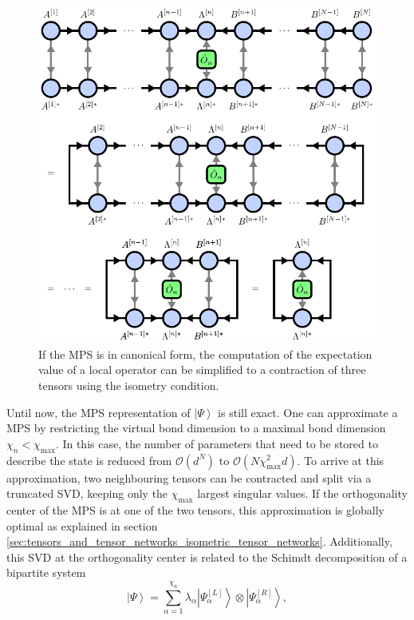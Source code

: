 \begin{figure}
	\centering
	\includegraphics[scale=1.0]{figures/tikz/Tensor_Networks/mps_canonical_form_local_expectation_value/mps_canonical_form_local_expectation_value.pdf}
	\caption{If the MPS is in canonical form, the computation of the expectation value of a local operator can be simplified to a contraction of three tensors using the isometry condition.}
	\label{fig:mps_local_expectation_value_canonical}
\end{figure}
Until now, the MPS representation of $\left|\Psi\right\rangle$ is still exact. One can approximate a MPS by restricting the virtual bond dimension to a maximal bond dimension $\chi_n < \chi_\text{max}$. In this case, the number of parameters that need to be stored to describe the state is reduced from $\mathcal{O}\left(d^N\right)$ to $\mathcal{O}\left(N\chi_\text{max}^2 d\right)$. To arrive at this approximation, two neighbouring tensors can be contracted and split via a truncated SVD, keeping only the $\chi_\text{max}$ largest singular values. If the orthogonality center of the MPS is at one of the two tensors, this approximation is globally optimal as explained in section \ref{sec:tensors_and_tensor_networks_isometric_tensor_networks}. Additionally, this SVD at the orthogonality center is related to the Schimdt decomposition of a bipartite system
\begin{equation}
	\left|\Psi\right\rangle = \sum_{\alpha=1}^{\chi_n} \lambda_\alpha \left| \Psi^{[L]}_\alpha\right\rangle \otimes \left|\Psi^{[R]}_\alpha\right\rangle,
\end{equation}

